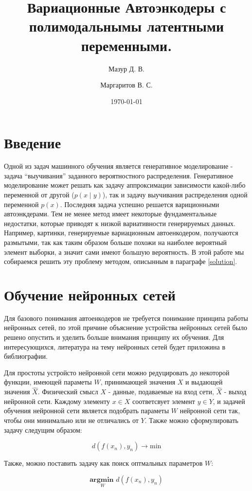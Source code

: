 \documentclass[a4paper]{report}
\title{Вариационные Автоэнкодеры с полимодальнымы латентными переменными.}
\author{Мазур Д. В.%
}
\affil{Школа №1505 "Преображенская"}
\author{Маргаритов В. С.%
}
\affil{Консультант}
\date{\today}
\begin{document}
\maketitle

\tableofcontents
\newpage

\chapter{Введение}
Одной из задач машинного обучения является генеративное моделирование - задача ``выучивания'' заданного вероятностного распределения. Генеративное
моделирование может решать как задачу аппроксимации зависимости какой-либо переменной от другой ($p(x \mid y)$), так и задачу выучивания распределения
одной переменной $p(x)$. Последняя задача успешно решается вариционными автоэнкдерами. Тем не менее метод имеет некоторые фундаментальные недостатки,
которые приводят к низкой вариативности генерируемых данных. Например, картинки, генерируемые вариационным автоенкодером, получаются размытыми, так
как таким образом больше похожи на наиболее вероятный элемент выборки, а значит сами имеют большую вероятность. В этой работе мы собираемся решить
эту проблему методом, описынным в параграфе \ref{solution}.


\chapter{Обучение нейронных сетей}
Для базового понимания автоенкодеров не требуется понимание принципа работы нейронных сетей, по этой причине объяснение устройства нейронных сетей было решено опустить 
и уделить больше внимания принципу их обучения. Для интересующихся, литература на тему нейронных сетей будет приложина в библиографии.

Для простоты устройсто нейронной сети можно редуцировать до некоторой функции, имеющей параметы $W$, принимающей значения $X$ и выдающей значения $\widehat{X}$. 
Физический смысл $X$ - данные, подаваемые на вход сети, $\widehat{X}$ - выход нейронной сети. Каждому элементу $x \in X$ соответсвует элемент $y \in Y$, и задачей обучения
нейронной сети является подобрать параметы $W$ нейронной сети так, чтобы они минимально или не отличались от $Y$. Также можно сформулировать задачу следущим образом:

$$d(f(x_n), y_n) \rightarrow \text{min}$$

Также, можно поставить задачу как поиск оптмальных параметров $W$:

$$\underset{W}{\textbf{argmin }} d(f(x_n), y_n)$$ 
\end{document}
